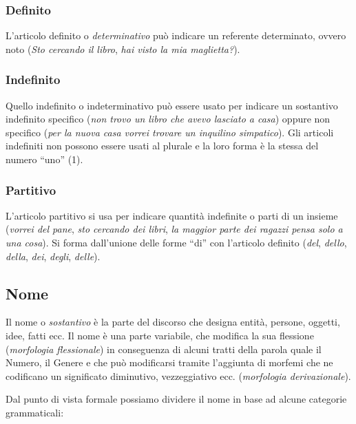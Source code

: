 \documentclass[a4paper,twoside,11pt,chapterprefix=false,bibliography=totocnumbered,listof=flat]{scrbook}
\begin{document}
\hypertarget{definito}{%
\subsubsection{Definito}\label{definito}}

L'articolo definito o \emph{determinativo} può indicare un referente
determinato, ovvero noto (\emph{Sto cercando il libro}, \emph{hai visto
la mia maglietta?}).

\hypertarget{indefinito}{%
\subsubsection{Indefinito}\label{indefinito}}

Quello indefinito o indeterminativo può essere usato per indicare un
sostantivo indefinito specifico (\emph{non trovo un libro che avevo
lasciato a casa}) oppure non specifico (\emph{per la nuova casa vorrei
trovare un inquilino simpatico}). Gli articoli indefiniti non possono
essere usati al plurale e la loro forma è la stessa del numero
\enquote{uno} (1).

\hypertarget{partitivo}{%
\subsubsection{Partitivo}\label{partitivo}}

L'articolo partitivo si usa per indicare quantità indefinite o parti di
un insieme (\emph{vorrei del pane}, \emph{sto cercando dei libri},
\emph{la maggior parte dei ragazzi pensa solo a una cosa}). Si forma
dall'unione delle forme \enquote{di} con l'articolo definito
(\emph{del}, \emph{dello}, \emph{della}, \emph{dei}, \emph{degli},
\emph{delle}).

\hypertarget{nome}{%
\subsection{Nome}\label{nome}}

Il nome o \emph{sostantivo} è la parte del discorso che designa entità,
persone, oggetti, idee, fatti ecc. Il nome è una parte variabile, che
modifica la sua flessione (\emph{morfologia flessionale}) in conseguenza
di alcuni tratti della parola quale il Numero, il Genere e che può
modificarsi tramite l'aggiunta di morfemi che ne codificano un
significato diminutivo, vezzeggiativo ecc. (\emph{morfologia
derivazionale}).

Dal punto di vista formale possiamo dividere il nome in base ad alcune
categorie grammaticali:
\end{document}
